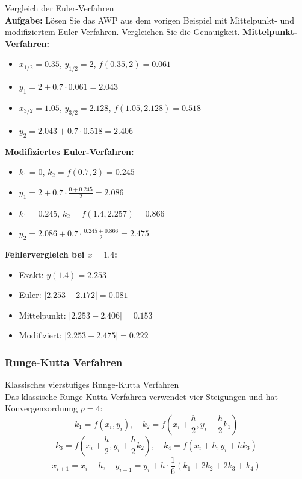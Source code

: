 \begin{example2}{Vergleich der Euler-Verfahren}\\
\textbf{Aufgabe:} Lösen Sie das AWP aus dem vorigen Beispiel mit Mittelpunkt- und modifiziertem Euler-Verfahren. Vergleichen Sie die Genauigkeit.
\tcblower
\textbf{Mittelpunkt-Verfahren:}
\begin{itemize}
    \item $x_{1/2} = 0.35$, $y_{1/2} = 2$, $f(0.35, 2) = 0.061$
    \item $y_1 = 2 + 0.7 \cdot 0.061 = 2.043$
    \item $x_{3/2} = 1.05$, $y_{3/2} = 2.128$, $f(1.05, 2.128) = 0.518$
    \item $y_2 = 2.043 + 0.7 \cdot 0.518 = 2.406$
\end{itemize}
\vspace{2mm}
\textbf{Modifiziertes Euler-Verfahren:}
\begin{itemize}
    \item $k_1 = 0$, $k_2 = f(0.7, 2) = 0.245$
    \item $y_1 = 2 + 0.7 \cdot \frac{0 + 0.245}{2} = 2.086$
    \item $k_1 = 0.245$, $k_2 = f(1.4, 2.257) = 0.866$
    \item $y_2 = 2.086 + 0.7 \cdot \frac{0.245 + 0.866}{2} = 2.475$
\end{itemize}
\vspace{2mm}
\textbf{Fehlervergleich bei $x = 1.4$:}
\begin{itemize}
    \item Exakt: $y(1.4) = 2.253$
    \item Euler: $|2.253 - 2.172| = 0.081$
    \item Mittelpunkt: $|2.253 - 2.406| = 0.153$
    \item Modifiziert: $|2.253 - 2.475| = 0.222$
\end{itemize}
\end{example2}

\subsubsection{Runge-Kutta Verfahren}

\begin{theorem}{Klassisches vierstufiges Runge-Kutta Verfahren}\\
Das klassische Runge-Kutta Verfahren verwendet vier Steigungen und hat Konvergenzordnung $p = 4$:
\vspace{-2mm}\\
$$k_1 = f(x_i, y_i), \quad
k_2 = f(x_i + \frac{h}{2}, y_i + \frac{h}{2} k_1)$$
$$k_3 = f(x_i + \frac{h}{2}, y_i + \frac{h}{2} k_2), \quad
k_4 = f(x_i + h, y_i + h k_3)$$
$$x_{i+1} = x_i + h, \quad
y_{i+1} = y_i + h \cdot \frac{1}{6}(k_1 + 2k_2 + 2k_3 + k_4)$$
\end{theorem}

